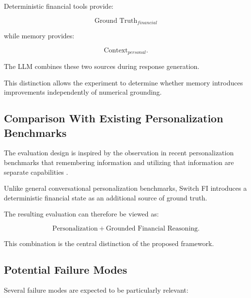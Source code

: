\documentclass[conference]{IEEEtran}
\begin{document}
    Deterministic financial tools provide:
    
    \begin{equation}
    \text{Ground Truth}_{financial}
    \end{equation}
    
    while memory provides:
    
    \begin{equation}
    \text{Context}_{personal}.
    \end{equation}
    
    The LLM combines these two sources during response generation.
    
    This distinction allows the experiment to determine whether memory
    introduces improvements independently of numerical grounding.
    
    \subsection{Comparison With Existing Personalization Benchmarks}
    
    The evaluation design is inspired by the observation in recent
    personalization benchmarks that remembering information and utilizing
    that information are separate capabilities \cite{alpsbench}.
    
    Unlike general conversational personalization benchmarks, Switch FI
    introduces a deterministic financial state as an additional source of
    ground truth.
    
    The resulting evaluation can therefore be viewed as:
    
    \begin{equation}
    \text{Personalization}
    +
    \text{Grounded Financial Reasoning}.
    \end{equation}
    
    This combination is the central distinction of the proposed framework.
    
    \subsection{Potential Failure Modes}
    
    Several failure modes are expected to be particularly relevant:
    
\end{document}
